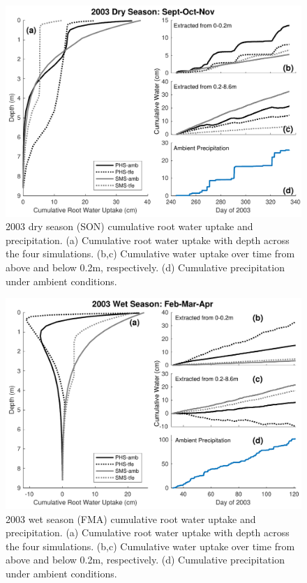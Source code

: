 \documentclass[draft,linenumbers]{agujournal}
\begin{document}
        \clearpage
    \begin{figure}[h]
     \centering
     \includegraphics[width=30pc]{../figs3/fig7.pdf}
     \caption{2003 dry season (SON) cumulative root water uptake and precipitation. 
     (a) Cumulative root water uptake with depth across the four simulations.
     (b,c) Cumulative water uptake over time from above and below 0.2m, respectively.
     (d) Cumulative precipitation under ambient conditions.
     }
     \label{fig7}
  \end{figure}
  
        \clearpage
    \begin{figure}[h]
     \centering
     \includegraphics[width=30pc]{../figs3/fig8.pdf}
     \caption{2003 wet season (FMA) cumulative root water uptake and precipitation. 
     (a) Cumulative root water uptake with depth across the four simulations.
     (b,c) Cumulative water uptake over time from above and below 0.2m, respectively.
     (d) Cumulative precipitation under ambient conditions.
     }
     \label{fig8}
  \end{figure}
  
\end{document}
